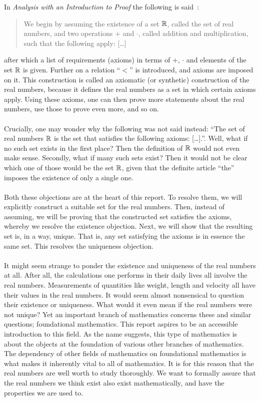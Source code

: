 \documentclass[../main.tex]{subfiles}
\begin{document}
In \textit{Analysis with an Introduction to Proof} the following is said~\cite{Lay2014}:
\begin{quote}
    We begin by assuming the existence of a set $\mathbb{R}$, called the set of real numbers, and two operations $+$ and $\cdot$, called addition and multiplication, such that the following apply: [\ldots]
\end{quote}
after which a list of requirements (axioms) in terms of $+$, $\cdot$ and elements of the set $\mathbb{R}$ is given. Further on a relation ``$<$'' is introduced, and axioms are imposed on it. This construction is called an axiomatic (or synthetic) construction of the real numbers, because it defines the real numbers as a set in which certain axioms apply. Using these axioms, one can then prove more statements about the real numbers, use those to prove even more, and so on. \\\\
Crucially, one may wonder why the following was not said instead: ``The set of real numbers $\mathbb{R}$ is the set that satisfies the following axioms: [\ldots].''. Well, what if no such set exists in the first place? Then the definition of $\mathbb{R}$ would not even make sense. Secondly, what if many such sets exist? Then it would not be clear which one of those would be the set $\mathbb{R}$, given that the definite article ``the'' imposes the existence of only a single one. \\\\
Both these objections are at the heart of this report. To resolve them, we will explicitly construct a suitable set for the real numbers. Then, instead of assuming, we will be proving that the constructed set satisfies the axioms, whereby we resolve the existence objection. Next, we will show that the resulting set is, in a way, unique. That is, any set satisfying the axioms is in essence the same set. This resolves the uniqueness objection. \\\\
It might seem strange to ponder the existence and uniqueness of the real numbers at all. After all, the calculations one performs in their daily lives all involve the real numbers. Measurements of quantities like weight, length and velocity all have their values in the real numbers. It would seem almost nonsensical to question their existence or uniqueness. What would it even mean if the real numbers were not unique? Yet an important branch of mathematics concerns these and similar questions; foundational mathematics. This report aspires to be an accessible introduction to this field. As the name suggests, this type of mathematics is about the objects at the foundation of various other branches of mathematics. The dependency of other fields of mathematics on foundational mathematics is what makes it inherently vital to all of mathematics. It is for this reason that the real numbers are well worth to study thoroughly. We want to formally assure that the real numbers we think exist also exist mathematically, and have the properties we are used to. \\\\
\end{document}
